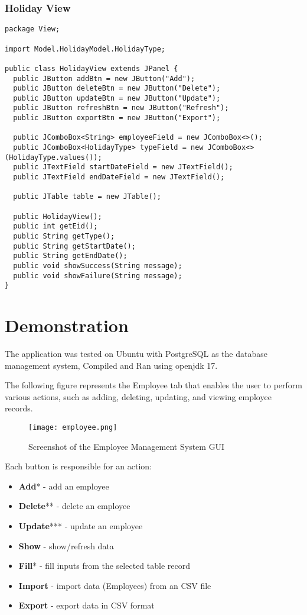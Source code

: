 \documentclass[12pt]{article}
\begin{document}
\subsubsection{Holiday View}
\begin{lstlisting}
package View;

import Model.HolidayModel.HolidayType;

public class HolidayView extends JPanel {
  public JButton addBtn = new JButton("Add");
  public JButton deleteBtn = new JButton("Delete");
  public JButton updateBtn = new JButton("Update");
  public JButton refreshBtn = new JButton("Refresh");
  public JButton exportBtn = new JButton("Export");

  public JComboBox<String> employeeField = new JComboBox<>();
  public JComboBox<HolidayType> typeField = new JComboBox<>(HolidayType.values());
  public JTextField startDateField = new JTextField();
  public JTextField endDateField = new JTextField();

  public JTable table = new JTable();

  public HolidayView();
  public int getEid();
  public String getType();
  public String getStartDate();
  public String getEndDate();
  public void showSuccess(String message);
  public void showFailure(String message);
}
\end{lstlisting}

\pagebreak

\section{Demonstration}

The application was tested on Ubuntu with PostgreSQL as the
database management system, Compiled and Ran using openjdk 17.

\vspace{0.6cm}

The following figure represents the Employee tab that enables
the user to perform various actions, such as adding, deleting,
updating, and viewing employee records.

\begin{figure}[H]
  \centering
  \texttt{[image: employee.png]}
  \caption{Screenshot of the Employee Management System GUI}
\end{figure}

Each button is responsible for an action:

\begin{itemize}
    \item \textbf{Add}* - add an employee
    \item \textbf{Delete}** - delete an employee
    \item \textbf{Update}*** - update an employee
    \item \textbf{Show} - show/refresh data
    \item \textbf{Fill}* - fill inputs from the selected table record
    \item \textbf{Import} - import data (Employees) from an CSV file
    \item  \textbf{Export} - export data in CSV format 
\end{itemize}
\end{document}
